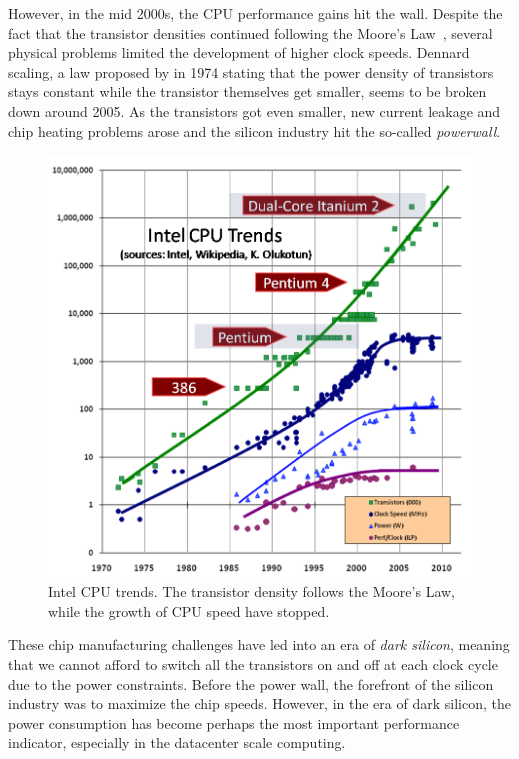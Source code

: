 However, in the mid 2000s, the CPU performance gains hit the wall. Despite the fact that the transistor densities continued following the Moore's Law~\cite{Moore:1998:MooresLaw}, several physical problems limited the development of higher clock speeds. Dennard scaling, a law proposed by in 1974 stating that the power density of transistors stays constant while the transistor themselves get smaller, seems to be broken down around 2005. As the transistors got even smaller, new current leakage and chip heating problems arose and the silicon industry hit the so-called \emph{powerwall}.~\cite{Esmaeilzadeh:2011:DSE, Sutter:2005:FLiO, Ributzka:2013:Concurrency}

\begin{figure}[]
  \begin{center}
    \includegraphics[width=\textwidth]{images/free-lunch-is-over.png}
    \caption{Intel CPU trends. The transistor density follows the Moore's Law, while the growth of CPU speed have stopped.~\cite{Sutter:2005:FLiO}}
    \label{fig:rne-example}
  \end{center}
\end{figure}

These chip manufacturing challenges have led into an era of \emph{dark silicon}, meaning that we cannot afford to switch all the transistors on and off at each clock cycle due to the power constraints. Before the power wall, the forefront of the silicon industry was to maximize the chip speeds. However, in the era of dark silicon, the power consumption has become perhaps the most important performance indicator, especially in the datacenter scale computing.~\cite{Sutter:2005:FLiO, Asanovic:2006:Landscape, Ributzka:2013:Concurrency, Zhang:2010:CloudComputing}


